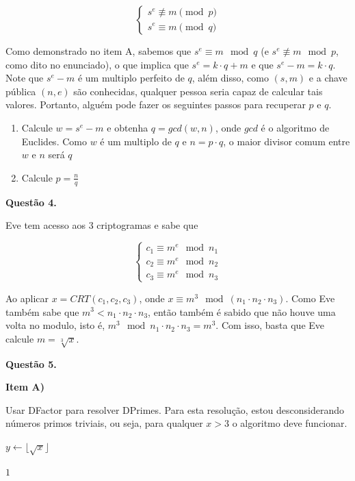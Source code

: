 \documentclass{article}
\begin{document}
\[
        \begin{cases}
                s^e \not\equiv m \pmod p \\
                s^e \equiv m \pmod q
        \end{cases}
\]

Como demonstrado no item A, sabemos que $s^e \equiv m \mod q$ (e $s^e \not\equiv m \mod p$, como dito no enunciado), o que implica que $s^e = k \cdot q + m$ e que $s^e - m = k \cdot q$. Note que $s^e - m$ é um multiplo perfeito de $q$, além disso, como $(s,m)$ e a chave pública $(n, e)$ são conhecidas, qualquer pessoa seria capaz de calcular tais valores. Portanto, alguém pode fazer os seguintes passos para recuperar $p$ e $q$.

\begin{enumerate}
        \item Calcule $w = s^e - m$ e obtenha $q = gcd(w,n)$, onde $gcd$ é o algoritmo de Euclides. Como $w$ é um multiplo de $q$ e $n = p \cdot q$, o maior divisor comum entre $w$ e $n$ será $q$
        \item Calcule $p = \frac{n}{q}$
\end{enumerate}

\textbf{Questão 4.}

Eve tem acesso aos 3 criptogramas e sabe que

\[
        \begin{cases}
                c_1 \equiv m^e \mod n_1 \\
                c_2 \equiv m^e \mod n_2 \\
                c_3 \equiv m^e \mod n_3
        \end{cases}
\]

Ao aplicar $x = CRT(c_1,c_2,c_3)$, onde $x \equiv m^3 \mod (n_1 \cdot n_2 \cdot n_3)$. Como Eve também sabe que $m^3 < n_1 \cdot n_2 \cdot n_3$, então também é sabido que não houve uma volta no modulo, isto é, $m^3 \mod n_1 \cdot n_2 \cdot n_3 = m^3$. Com isso, basta que Eve calcule $m = \sqrt[3]{x}$.

\textbf{Questão 5.}

\textbf{Item A)}

Usar DFactor para resolver DPrimes. Para esta resolução, estou desconsiderando números primos triviais, ou seja, para qualquer $x > 3$ o algoritmo deve funcionar.

\begin{algorithm}[H]
\caption{DPrimes}

$y \leftarrow \lfloor \sqrt{x} \rfloor$


\Return $1$

\end{algorithm}
\end{document}
